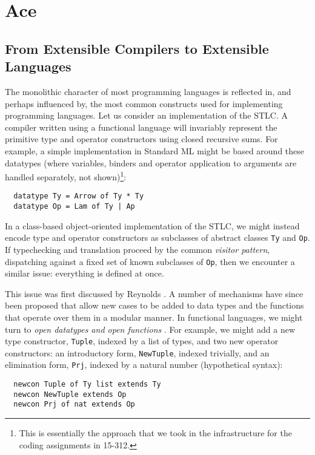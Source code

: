 \section{Ace}\label{ace}
\subsection{From Extensible Compilers to Extensible Languages}\label{evolution}
The monolithic character of most programming languages is reflected in, and perhaps influenced by, the most common constructs used for implementing programming languages.
Let us consider an implementation of the STLC. 
A compiler written using a functional language will invariably represent the primitive type  and operator constructors using {closed} recursive sums. 
For example, a simple implementation in Standard ML might be based around these datatypes (where variables, binders and operator application to arguments are handled separately, not shown)\footnote{This is essentially the approach that we took in the infrastructure for the coding assignments in 15-312.}:
\begin{lstlisting}
  datatype Ty = Arrow of Ty * Ty
  datatype Op = Lam of Ty | Ap 
\end{lstlisting}


In a class-based object-oriented implementation of the STLC, we might instead encode type and operator constructors as subclasses of abstract classes \verb|Ty| and \verb|Op|. If typechecking and translation proceed by the common \emph{visitor pattern}, dispatching against a fixed set of {known} subclasses of \verb|Op|, then we encounter a similar issue: everything is defined at once. 

This issue was first discussed by Reynolds \cite{Reynolds75}. A number of mechanisms have since been proposed that allow new cases to be added to data types and the functions that operate over them in a modular manner. 
In functional languages, we might turn to \emph{open datatypes and open functions} \cite{conf/ppdp/LohH06}. For example, we might add a new type constructor, \verb|Tuple|, indexed by a list of types, and two new operator constructors: an introductory form, \verb|NewTuple|, indexed trivially, and an elimination form, \verb|Prj|, indexed by a natural number (hypothetical syntax):
\begin{lstlisting}
  newcon Tuple of Ty list extends Ty
  newcon NewTuple extends Op
  newcon Prj of nat extends Op
\end{lstlisting}

